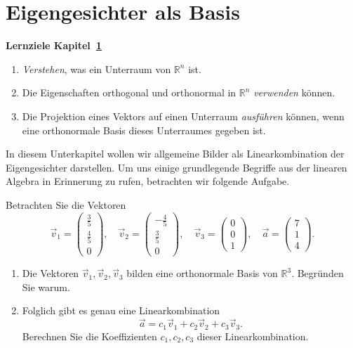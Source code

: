\section{Eigengesichter als Basis} \label{sec:eigenbasis}
\begin{tcolorbox}
	\centerline{\textbf{Lernziele Kapitel~\ref{sec:eigenbasis}}}
	\begin{enumerate}[leftmargin=*,label=\thesection.\arabic*]
		\item \textit{Verstehen}, was ein Unterraum von $\mathbb R^n$ ist.
		\item Die Eigenschaften \glqq{}orthogonal\grqq{} und \glqq{}orthonormal\grqq{} in $\mathbb R^n$ \textit{verwenden} können.
		\item Die Projektion eines Vektors auf einen Unterraum \textit{ausführen} können, wenn eine orthonormale Basis dieses Unterraumes gegeben ist.
	\end{enumerate}
\end{tcolorbox}
In diesem Unterkapitel wollen wir allgemeine Bilder als Linearkombination der Eigengesichter darstellen.
Um uns einige grundlegende Begriffe aus der linearen Algebra in Erinnerung zu rufen, betrachten wir folgende Aufgabe.
\begin{aufgabe}
	Betrachten Sie die Vektoren
	\begin{equation*}
		\vec v_1=\begin{pmatrix}
			\tfrac{3}{5} \\ \tfrac{4}{5} \\ 0
		\end{pmatrix},\quad
		\vec v_2=\begin{pmatrix}
			-\tfrac{4}{5} \\ \tfrac{3}{5} \\  0
		\end{pmatrix},\quad
		\vec v_3=\begin{pmatrix}
			0 \\ 0 \\  1
		\end{pmatrix},\quad
		\vec a=\begin{pmatrix}
			7 \\ 1 \\  4
		\end{pmatrix}.
	\end{equation*}
	\begin{enumerate}[label=(\alph*)]
		\item Die Vektoren $\vec v_1,\vec v_2,\vec v_3$ bilden eine orthonormale Basis von $\mathbb R^3$.
		Begründen Sie warum.
		\item Folglich gibt es genau eine Linearkombination
		\begin{equation*}
			\vec a=c_1\vec v_1+c_2\vec v_2+c_3\vec v_3.
		\end{equation*}
		Berechnen Sie die Koeffizienten $c_1,c_2,c_3$ dieser Linearkombination.
	\end{enumerate}
\end{aufgabe}
